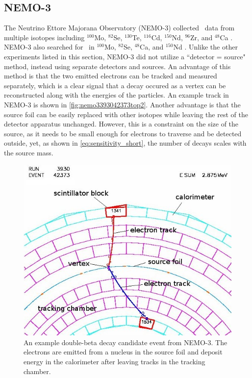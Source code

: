 \subsection{NEMO-3}
The Neutrino Ettore Majorana Observatory (NEMO-3) collected \twonubb~data from multiple isotopes including $^{100}$Mo, $^{82}$Se, $^{130}$Te, $^{116}$Cd, $^{150}$Nd, $^{96}$Zr, and $^{48}$Ca \cite{Bongrand:2011ei}.
NEMO-3 also searched for \zeronubb~in $^{100}$Mo, $^{82}$Se, $^{48}$Ca, and $^{150}$Nd \cite{Bongrand:2011ei}\cite{Arnold:2016qyg}\cite{Arnold:2016ezh}.
Unlike the other experiments listed in this section, NEMO-3 did not utilize a ``detector = source" method, instead using separate detectors and sources.
An advantage of this method is that the two emitted electrons can be tracked and measured separately, which is a clear signal that a decay occured as a vertex can be reconstructed along with the energies of the particles.
An example track in NEMO-3 is shown in \autoref{fig:nemo3393042373top2}.
Another advantage is that the source foil can be easily replaced with other isotopes while leaving the rest of the detector apparatus unchanged.
However, this is a constraint on the size of the source, as it needs to be small enough for electrons to traverse and be detected outside, yet, as shown in \autoref{eq:sensitivity_short}, the number of decays scales with the source mass.
\begin{figure}[htbp]
\centering
\includegraphics[width=0.7\linewidth]{Figures/nemo3_3930_42373_top_2}
\caption[An example double-beta decay candidate event from NEMO-3]
{An example double-beta decay candidate event from NEMO-3.
The electrons are emitted from a nucleus in the source foil and deposit energy in the calorimeter after leaving tracks in the tracking chamber.}
\label{fig:nemo3393042373top2}
\end{figure}
